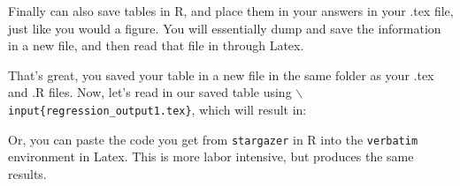 \documentclass[12pt,letterpaper]{article}
\begin{document}
\noindent Finally can also save tables in R, and place them in your answers in your .tex file, just like you would a figure. You will essentially dump and save the information in a new file, and then read that file in through Latex.

  

\noindent That's great, you saved your table in a new file in the same folder as your .tex and .R files. Now, let's read in our saved table using \texttt{$\backslash$input\{regression\_output1.tex\}}, which will result in:



\noindent Or, you can paste the code you get from \texttt{stargazer} in R into the \texttt{verbatim} environment in Latex. This is more labor intensive, but produces the same results.
\end{document}
